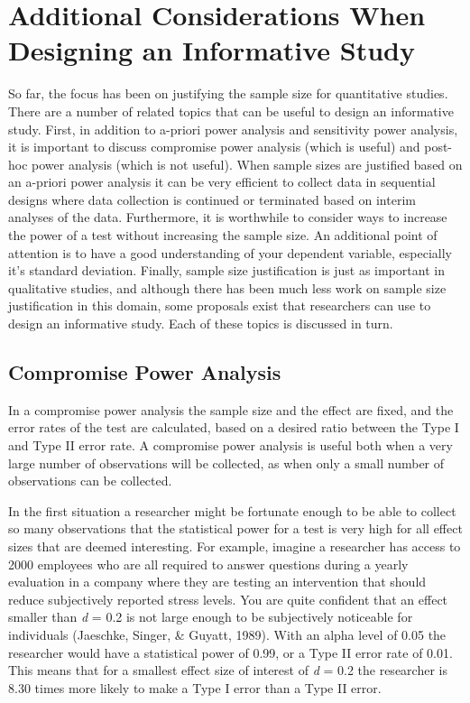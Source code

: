 \documentclass[
  english,
  ,jou, a4paper,floatsintext]{apa6}
\begin{document}
\hypertarget{additional-considerations-when-designing-an-informative-study}{%
\section{Additional Considerations When Designing an Informative Study}\label{additional-considerations-when-designing-an-informative-study}}

So far, the focus has been on justifying the sample size for quantitative studies. There are a number of related topics that can be useful to design an informative study. First, in addition to a-priori power analysis and sensitivity power analysis, it is important to discuss compromise power analysis (which is useful) and post-hoc power analysis (which is not useful). When sample sizes are justified based on an a-priori power analysis it can be very efficient to collect data in sequential designs where data collection is continued or terminated based on interim analyses of the data. Furthermore, it is worthwhile to consider ways to increase the power of a test without increasing the sample size. An additional point of attention is to have a good understanding of your dependent variable, especially it's standard deviation. Finally, sample size justification is just as important in qualitative studies, and although there has been much less work on sample size justification in this domain, some proposals exist that researchers can use to design an informative study. Each of these topics is discussed in turn.

\hypertarget{compromise-power-analysis}{%
\subsection{Compromise Power Analysis}\label{compromise-power-analysis}}

In a compromise power analysis the sample size and the effect are fixed, and the error rates of the test are calculated, based on a desired ratio between the Type I and Type II error rate. A compromise power analysis is useful both when a very large number of observations will be collected, as when only a small number of observations can be collected.

In the first situation a researcher might be fortunate enough to be able to collect so many observations that the statistical power for a test is very high for all effect sizes that are deemed interesting. For example, imagine a researcher has access to 2000 employees who are all required to answer questions during a yearly evaluation in a company where they are testing an intervention that should reduce subjectively reported stress levels. You are quite confident that an effect smaller than \emph{d} = 0.2 is not large enough to be subjectively noticeable for individuals (Jaeschke, Singer, \& Guyatt, 1989). With an alpha level of 0.05 the researcher would have a statistical power of 0.99, or a Type II error rate of 0.01. This means that for a smallest effect size of interest of \emph{d} = 0.2 the researcher is 8.30 times more likely to make a Type I error than a Type II error.
\end{document}
